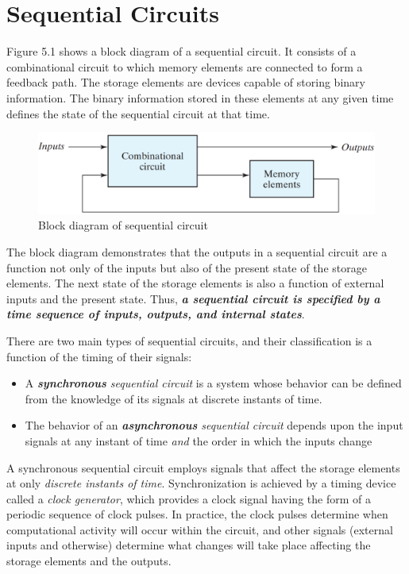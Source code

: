 \section{Sequential Circuits}
\label{sec:seq-cir}

Figure 5.1 shows a block diagram of a sequential circuit. It consists of a combinational circuit to which memory elements are connected to form a feedback path. The storage elements are devices capable of storing binary information. The binary information stored in these elements at any given time defines the state of the sequential circuit at that time.

\begin{figure}[H]
  \centering
  \includegraphics[width=\linewidth]{img/fig-5.1.png}
  \caption{Block diagram of sequential circuit}
  \label{fig:5.1}
\end{figure}

The block diagram demonstrates that the outputs in a sequential circuit are a function not only of the inputs but also of the present state of the storage elements. The next state of the storage elements is also a function of external inputs and the present state. Thus, \textit{\textbf{a sequential circuit is specified by a time sequence of inputs, outputs, and internal states}}.

There are two main types of sequential circuits, and their classification is a function of the timing of their signals:
\begin{itemize}
  \item A \textit{\textbf{synchronous} sequential circuit} is a system whose behavior can be defined from the knowledge of its signals at discrete instants of time.
  \item The behavior of an \textit{\textbf{asynchronous} sequential circuit} depends upon the input signals at any instant of  time \textit{and} the order in which the inputs change
\end{itemize}

A synchronous sequential circuit employs signals that affect the storage elements at only \textit{discrete instants of time}. Synchronization is achieved by a timing device called a \textit{clock generator}, which provides a clock signal having the form of a periodic sequence of clock pulses. In practice, the clock pulses determine when computational activity will occur within the circuit, and other signals (external inputs and otherwise) determine what changes will take place affecting the storage elements and the outputs.

